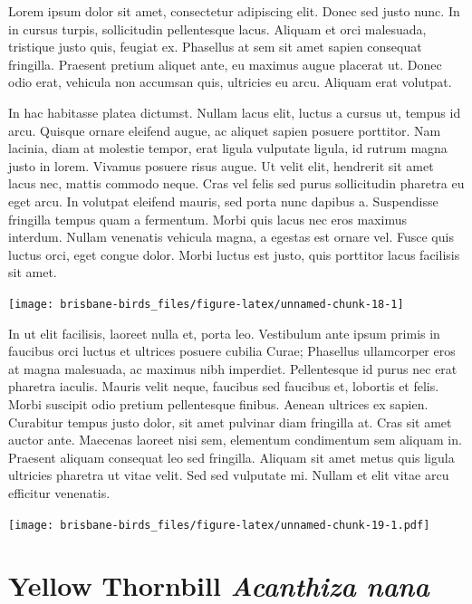 \documentclass[]{book}
\let\origfigure\figure
\let\endorigfigure\endfigure
\renewenvironment{figure}[1][2] {
  \expandafter\origfigure\expandafter[H]
} {
  \endorigfigure
}
\begin{document}
Lorem ipsum dolor sit amet, consectetur adipiscing elit. Donec sed justo
nunc. In in cursus turpis, sollicitudin pellentesque lacus. Aliquam et
orci malesuada, tristique justo quis, feugiat ex. Phasellus at sem sit
amet sapien consequat fringilla. Praesent pretium aliquet ante, eu
maximus augue placerat ut. Donec odio erat, vehicula non accumsan quis,
ultricies eu arcu. Aliquam erat volutpat.

In hac habitasse platea dictumst. Nullam lacus elit, luctus a cursus ut,
tempus id arcu. Quisque ornare eleifend augue, ac aliquet sapien posuere
porttitor. Nam lacinia, diam at molestie tempor, erat ligula vulputate
ligula, id rutrum magna justo in lorem. Vivamus posuere risus augue. Ut
velit elit, hendrerit sit amet lacus nec, mattis commodo neque. Cras vel
felis sed purus sollicitudin pharetra eu eget arcu. In volutpat eleifend
mauris, sed porta nunc dapibus a. Suspendisse fringilla tempus quam a
fermentum. Morbi quis lacus nec eros maximus interdum. Nullam venenatis
vehicula magna, a egestas est ornare vel. Fusce quis luctus orci, eget
congue dolor. Morbi luctus est justo, quis porttitor lacus facilisis sit
amet.

\begin{figure}
\texttt{[image: brisbane-birds\_files/figure-latex/unnamed-chunk-18-1]} \caption{insert figure caption}\label{fig:unnamed-chunk-18}
\end{figure}

In ut elit facilisis, laoreet nulla et, porta leo. Vestibulum ante ipsum
primis in faucibus orci luctus et ultrices posuere cubilia Curae;
Phasellus ullamcorper eros at magna malesuada, ac maximus nibh
imperdiet. Pellentesque id purus nec erat pharetra iaculis. Mauris velit
neque, faucibus sed faucibus et, lobortis et felis. Morbi suscipit odio
pretium pellentesque finibus. Aenean ultrices ex sapien. Curabitur
tempus justo dolor, sit amet pulvinar diam fringilla at. Cras sit amet
auctor ante. Maecenas laoreet nisi sem, elementum condimentum sem
aliquam in. Praesent aliquam consequat leo sed fringilla. Aliquam sit
amet metus quis ligula ultricies pharetra ut vitae velit. Sed sed
vulputate mi. Nullam et elit vitae arcu efficitur venenatis.

\begin{figure}
\centering
\texttt{[image: brisbane-birds\_files/figure-latex/unnamed-chunk-19-1.pdf]}
\caption{\label{fig:unnamed-chunk-19}insert figure caption}
\end{figure}

\section{\texorpdfstring{Yellow Thornbill \emph{Acanthiza
nana}}{Yellow Thornbill Acanthiza nana}}\label{yellow-thornbill-acanthiza-nana}
\end{document}
